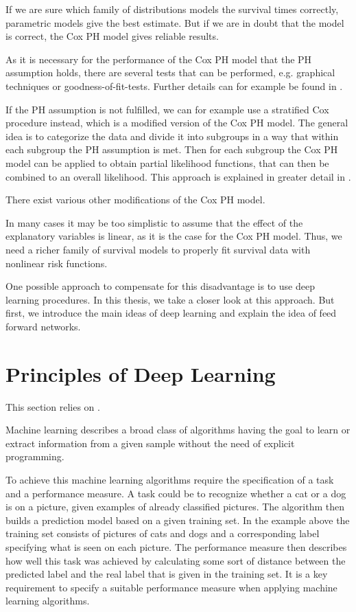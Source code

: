 \documentclass[12pt, a4paper]{scrartcl}
\theoremstyle{definition}
\theoremstyle{plain}
\numberwithin{equation}{section}
\numberwithin{figure}{section}
\numberwithin{table}{section}
\begin{document}
	If we are sure which family of distributions models the survival times correctly, parametric models give the best estimate.
	But if we are in doubt that the model is correct, the Cox PH model gives reliable results.
	
	As it is necessary for the performance of the Cox PH model that the PH assumption holds, there are several tests that can be performed, e.g. graphical techniques or goodness-of-fit-tests.
	Further details can for example be found in \citet*{sabook}.
	
	If the PH assumption is not fulfilled, we can for example use a stratified Cox procedure instead, which is a modified version of the Cox PH model.
	The general idea is to categorize the data and divide it into subgroups in a way that within each subgroup the PH assumption is met.
	Then for each subgroup the Cox PH model can be applied to obtain partial likelihood functions, that can then be combined to an overall likelihood.
	This approach is explained in greater detail in \citet*{sabook}.
	
	There exist various other modifications of the Cox PH model.
	
	In many cases it may be too simplistic to assume that the effect of the explanatory variables is linear, as it is the case for the Cox PH model.
	Thus, we need a richer family of survival models to properly fit survival data with nonlinear risk functions.
	
	One possible approach to compensate for this disadvantage is to use deep learning procedures.
	In this thesis, we take a closer look at this approach.
	But first, we introduce the main ideas of deep learning and explain the idea of feed forward networks.
	\newpage
	
	\section{Principles of Deep Learning}\label{basicsdl}
	This section relies on \citet*{deeplbook}.
	
	Machine learning describes a broad class of algorithms having the goal to learn or extract information from a given sample without the need of explicit programming.
	
	To achieve this machine learning algorithms require the specification of a task and a performance measure.
	A task could be to recognize whether a cat or a dog is on a picture, given examples of already classified pictures.
	The algorithm then builds a prediction model based on a given training set.
	In the example above the training set consists of pictures of cats and dogs and a corresponding label specifying what is seen on each picture.
	The performance measure then describes how well this task was achieved by calculating some sort of distance between the predicted label and the real label that is given in the training set.
	It is a key requirement to specify a suitable performance measure when applying machine learning algorithms.
	
\end{document}
